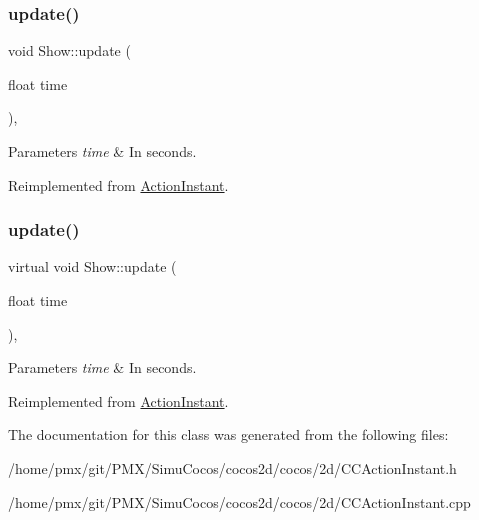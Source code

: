 \mbox{\label{classShow_a81b501eda1e567344ad4ecf695b1be86}} 
\subsubsection{\texorpdfstring{update()}{update()}\hspace{0.1cm}{\footnotesize\ttfamily [1/2]}}
{\footnotesize\ttfamily void Show\+::update (\begin{DoxyParamCaption}\item[{float}]{time }\end{DoxyParamCaption})\hspace{0.3cm}{\ttfamily [override]}, {\ttfamily [virtual]}}


\begin{DoxyParams}{Parameters}
{\em time} & In seconds. \\
\hline
\end{DoxyParams}


Reimplemented from \hyperlink{classActionInstant_a59875bf08cd1f58c0c8c6693ac540ade}{Action\+Instant}.

\mbox{\label{classShow_a83db57e795e0269471d06d4e49986ab0}} 
\subsubsection{\texorpdfstring{update()}{update()}\hspace{0.1cm}{\footnotesize\ttfamily [2/2]}}
{\footnotesize\ttfamily virtual void Show\+::update (\begin{DoxyParamCaption}\item[{float}]{time }\end{DoxyParamCaption})\hspace{0.3cm}{\ttfamily [override]}, {\ttfamily [virtual]}}


\begin{DoxyParams}{Parameters}
{\em time} & In seconds. \\
\hline
\end{DoxyParams}


Reimplemented from \hyperlink{classActionInstant_a59875bf08cd1f58c0c8c6693ac540ade}{Action\+Instant}.



The documentation for this class was generated from the following files\+:\begin{DoxyCompactItemize}
\item 
/home/pmx/git/\+P\+M\+X/\+Simu\+Cocos/cocos2d/cocos/2d/C\+C\+Action\+Instant.\+h\item 
/home/pmx/git/\+P\+M\+X/\+Simu\+Cocos/cocos2d/cocos/2d/C\+C\+Action\+Instant.\+cpp\end{DoxyCompactItemize}
